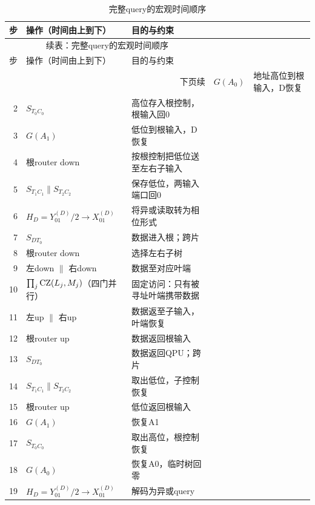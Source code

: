 {\small\setlength{\tabcolsep}{4pt}
\begin{longtable}{@{}r p{.44\linewidth} p{.43\linewidth}@{}}
\caption{完整query的宏观时间顺序}\label{tab:querysequence}\\\toprule
步 & 操作（时间由上到下） & 目的与约束\\\midrule\endfirsthead
\multicolumn{3}{c}{续表：完整query的宏观时间顺序}\\\toprule
步 & 操作（时间由上到下） & 目的与约束\\\midrule\endhead
\midrule\multicolumn{3}{r}{下页续}\endfoot
\bottomrule\endlastfoot
1 & $G(A_0)$ & 地址高位到根输入，D恢复\\
2 & $S_{T_0C_0}$ & 高位存入根控制，根输入回0\\
3 & $G(A_1)$ & 低位到根输入，D恢复\\
4 & 根router down & 按根控制把低位送至左右子输入\\
5 & $S_{T_1C_1}\parallel S_{T_2C_2}$ & 保存低位，两输入端口回0\\
6 & $H_D=Y_{01}^{(D)}/2\to X_{01}^{(D)}$ & 将异或读取转为相位形式\\
7 & $S_{DT_0}$ & 数据进入根；跨片\\
8 & 根router down & 选择左右子树\\
9 & 左down $\parallel$ 右down & 数据至对应叶端\\
10 & $\prod_j\mathrm{CZ}(L_j,M_j)$（四门并行） & 固定访问：只有被寻址叶端携带数据\\
11 & 左up $\parallel$ 右up & 数据返至子输入，叶端恢复\\
12 & 根router up & 数据返回根输入\\
13 & $S_{DT_0}$ & 数据返回QPU；跨片\\
14 & $S_{T_1C_1}\parallel S_{T_2C_2}$ & 取出低位，子控制恢复\\
15 & 根router up & 低位返回根输入\\
16 & $G(A_1)$ & 恢复A1\\
17 & $S_{T_0C_0}$ & 取出高位，根控制恢复\\
18 & $G(A_0)$ & 恢复A0，临时树回零\\
19 & $H_D=Y_{01}^{(D)}/2\to X_{01}^{(D)}$ & 解码为异或query\\
\end{longtable}}
